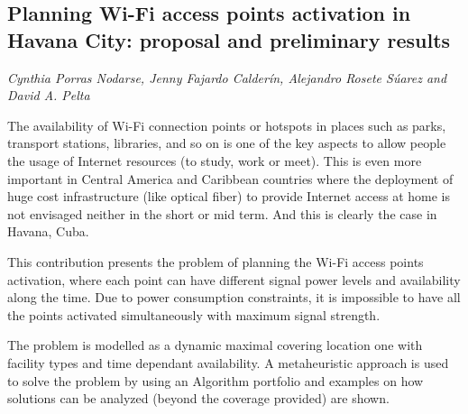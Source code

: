 \documentclass[../booklet.tex]{subfiles}
\begin{document}
\subsection[Planning Wi-Fi access points activation in Havana City: proposal and preliminary results. {\it Cynthia Porras Nodarse, Jenny Fajardo Calderín, Alejandro Rosete Súarez and David A. Pelta}]{Planning Wi-Fi access points activation in Havana City: proposal and preliminary results}
   

\begin{center}
  {\it Cynthia Porras Nodarse, Jenny Fajardo Calderín, Alejandro Rosete Súarez and David A. Pelta}
\end{center}

\vskip 0.8cm


The availability of Wi-Fi connection points or hotspots in places such as parks, transport stations, libraries, and so on is one of the key aspects to allow people the usage of Internet resources (to study, work or meet).
This is even more important in Central America and Caribbean countries where the deployment of huge cost infrastructure (like optical fiber) to provide Internet access at home is not envisaged neither in the short or mid term. And this is clearly the case in Havana, Cuba. 

This contribution presents the problem of planning the Wi-Fi access points activation, where each point can have different signal power levels and availability along the time. Due to power consumption constraints, it is impossible to have all the points activated simultaneously with maximum signal strength.

The problem is modelled as a dynamic maximal covering location one with facility types and time dependant availability. A metaheuristic approach is used to solve the problem by using an Algorithm portfolio and examples on how solutions can be analyzed (beyond the coverage provided)  are shown.

\end{document}
